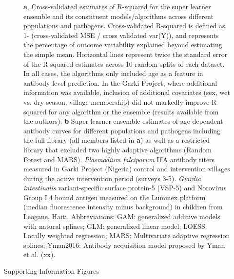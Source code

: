 \documentclass[11pt]{article}
\begin{document}
\begin{landscape}
\begin{figure}[htbp]
\begin{center}
\begin{minipage}{1.3\textwidth}
\caption{\textbf{a}, Cross-validated estimates of R-squared for the super learner ensemble and its constituent models/algorithms across different populations and pathogens. Cross-validated R-squared is defined as 1- (cross-validated MSE / cross validated var(Y)), and represents the percentage of outcome variability explained beyond estimating the simple mean. Horizontal lines represent twice the standard error of the R-squared estimates across 10 random splits of each dataset. In all cases, the algorithms only included age as a feature in antibody level prediction. In the Garki Project, where additional information was available, inclusion of additional covariates (sex, wet vs. dry season, village membership) did not markedly improve R-squared for any algorithm or the ensemble (results available from the authors).
\textbf{b} Super learner ensemble  estimates of age-dependent antibody curves for different populations and pathogens including the full library (all members listed in \textbf{a}) as well as a restricted library that excluded two highly adaptive algorithms (Random Forest and MARS).   
\textit{Plasmodium falciparum} IFA antibody titers measured in Garki Project (Nigeria) control and intervention villages during the active intervention period (surveys 3-5). \textit{Giardia intestinalis} variant-specific surface protein-5 (VSP-5) and Norovirus Group I.4 bound antigen measured on the Luminex platform (median fluorescence intensity minus background) in children from Leogane, Haiti.
Abbreviations: GAM: generalized additive models with natural splines; GLM: generalized linear model; LOESS: Locally weighted regression; MARS: Multivariate adaptive regression splines; Yman2016: Antibody acquisition model proposed by Yman et al. (xx).}
\label{fig:CVSL}
\end{minipage}
\end{center}
\end{figure}
\end{landscape}




\clearpage


\bigskip
\begin{center}
{\Large Supporting Information Figures}
\end{center}
\vspace{50pt}
\end{document}
